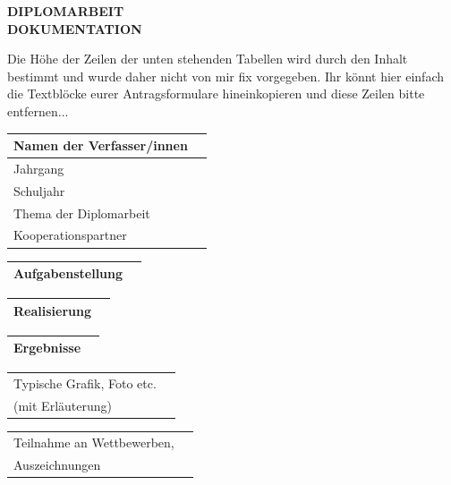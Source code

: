 \begin{center}
 \LARGE \textbf{DIPLOMARBEIT}\\
 \Large \textbf{DOKUMENTATION}\\
 \normalsize
\end{center}

Die Höhe der Zeilen der unten stehenden Tabellen wird durch den Inhalt bestimmt und wurde daher nicht von mir fix vorgegeben.
Ihr könnt hier einfach die Textblöcke eurer Antragsformulare hineinkopieren und diese Zeilen bitte entfernen...

\newlength{\feldC}
\newlength{\feldD}

\linespread{1.1} \normalsize
\begin{tabular}{|p{\feldC}|p{\feldD}|}
 \hline
 Namen der Verfasser/innen & \\
 \hline
 Jahrgang & \\ Schuljahr & \\
 \hline
 Thema der Diplomarbeit & \\
 \hline
 Kooperationspartner & \\
 \hline
\end{tabular}

\begin{tabular}{|p{\feldC}|p{\feldD}|}
 \hline
 Aufgabenstellung & \\
 \hline
\end{tabular}

\begin{tabular}{|p{\feldC}|p{\feldD}|}
 \hline
 Realisierung & \\
 \hline
\end{tabular}

\begin{tabular}{|p{\feldC}|p{\feldD}|}
 \hline
 Ergebnisse & \\
 \hline
\end{tabular}

\begin{tabular}{|p{\feldC}|p{\feldD}|}
 \hline
 Typische Grafik, Foto etc. & \\
  (mit Erläuterung) & \\
 \hline
\end{tabular}

\begin{tabular}{|p{\feldC}|p{\feldD}|}
 \hline
 Teilnahme an Wettbewerben, & \\
 Auszeichnungen & \\
 \hline
\end{tabular}

